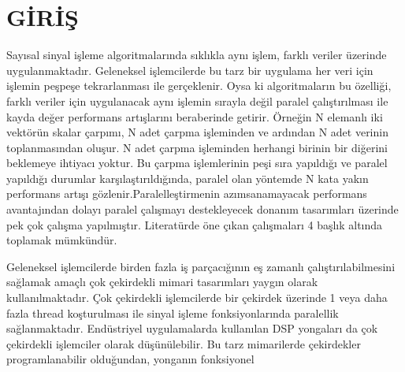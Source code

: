 \chapter{G\.{I}R\.{I}\c{S}}
Sayısal sinyal işleme algoritmalarında sıklıkla aynı işlem, farklı veriler üzerinde uygulanmaktadır. Geleneksel işlemcilerde bu tarz bir uygulama her veri için işlemin peşpeşe tekrarlanması ile gerçeklenir. Oysa ki algoritmaların bu özelliği, farklı veriler için uygulanacak aynı işlemin sırayla değil paralel çalıştırılması ile kayda değer performans artışlarını beraberinde getirir. Örneğin N elemanlı iki vektörün skalar çarpımı, N adet çarpma işleminden ve ardından N adet verinin toplanmasından oluşur. N adet çarpma işleminden herhangi birinin bir diğerini beklemeye ihtiyacı yoktur. Bu çarpma işlemlerinin peşi sıra yapıldığı ve paralel yapıldığı durumlar karşılaştırıldığında, paralel olan yöntemde N kata yakın performans artışı gözlenir.Paralelleştirmenin azımsanamayacak performans avantajından dolayı paralel çalışmayı destekleyecek donanım tasarımları üzerinde pek çok çalışma yapılmıştır. Literatürde öne çıkan çalışmaları 4 başlık altında toplamak mümkündür.  \par

Geleneksel işlemcilerde birden fazla iş parçacığının eş zamanlı çalıştırılabilmesini sağlamak amaçlı çok çekirdekli mimari tasarımları yaygın olarak kullanılmaktadır. Çok çekirdekli işlemcilerde bir çekirdek üzerinde 1 veya daha fazla thread koşturulması ile sinyal işleme fonksiyonlarında paralellik sağlanmaktadır. Endüstriyel uygulamalarda kullanılan DSP yongaları da çok çekirdekli işlemciler olarak düşünülebilir. Bu tarz mimarilerde çekirdekler programlanabilir olduğundan, yonganın fonksiyonel  

